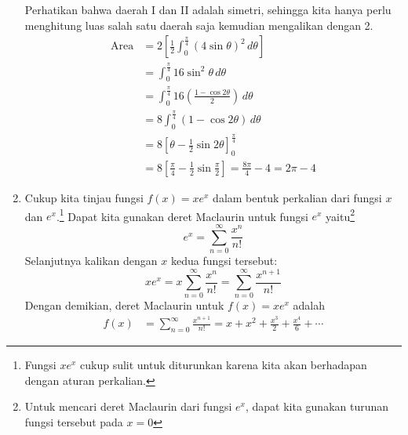 \documentclass[11pt,openany,a4paper]{article}
\begin{document}
\begin{enumerate}
\begin{center}
        \end{center}
        Perhatikan bahwa daerah I dan II adalah simetri, sehingga kita hanya perlu menghitung luas salah satu daerah saja kemudian mengalikan dengan 2.
        \begin{align*}
            \text{Area} &= 2\left[\frac{1}{2}\int_{0}^{\frac{\pi}{4}} (4\sin\theta)^2\, d\theta\right]\\
            &= \int_{0}^{\frac{\pi}{4}} 16\sin^2\theta \, d\theta\\
            &= \int_{0}^{\frac{\pi}{4}} 16\left(\frac{1-\cos 2\theta}{2}\right) \, d\theta\\
            &= 8\int_{0}^{\frac{\pi}{4}} \left(1-\cos 2\theta\right) \, d\theta\\
            &= 8\left[\theta - \frac{1}{2}\sin 2\theta\right]_{0}^{\frac{\pi}{4}}\\
            &= 8\left[\frac{\pi}{4} - \frac{1}{2}\sin \frac{\pi}{2}\right]= \frac{8\pi}{4} - 4 = \boxed{2\pi - 4}
        \end{align*}
        \item Cukup kita tinjau fungsi \( f(x) = xe^x \) dalam bentuk perkalian dari fungsi \( x \) dan \( e^x \).\footnote{Fungsi \( xe^x\) cukup sulit untuk diturunkan karena kita akan berhadapan dengan aturan perkalian.}
        Dapat kita gunakan deret Maclaurin untuk fungsi \( e^x \) yaitu\footnote{Untuk mencari deret Maclaurin dari fungsi \( e^x \), dapat kita gunakan turunan fungsi tersebut pada \( x = 0 \) }
        \[
            e^x = \sum_{n=0}^{\infty} \frac{x^n}{n!}
        \]
        Selanjutnya kalikan dengan \( x \) kedua fungsi tersebut:
        \[
            xe^x = x\sum_{n=0}^{\infty} \frac{x^n}{n!} = \sum_{n=0}^{\infty} \frac{x^{n+1}}{n!} 
        \]
        Dengan demikian, deret Maclaurin untuk $f(x) = xe^x$ adalah
        \begin{align*}
            f(x) &= \boxed{\sum_{n=0}^{\infty} \frac{x^{n+1}}{n!}} = x +x^2 + \frac{x^3}{2} + \frac{x^4}{6} + \cdots
        \end{align*}
    \end{enumerate}
\end{document}
